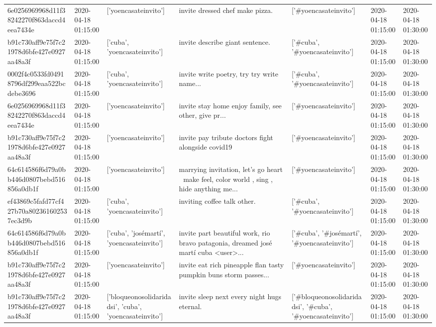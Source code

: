 \begin{tabular}{lllllll}
6e0256969968d11f38242270f863daccd4eea7434e & 2020-04-18 01:15:00 & ['yoencasateinvito'] & invite dressed chef make pizza. & ['#yoencasateinvito'] & 2020-04-18 01:15:00 & 2020-04-18 01:30:00 \\
b91c730aff9e75f7c21978d6bfe427e0927aa48a3f & 2020-04-18 01:15:00 & ['cuba', 'yoencasateinvito'] & invite describe giant sentence. & ['#cuba', '#yoencasateinvito'] & 2020-04-18 01:15:00 & 2020-04-18 01:30:00 \\
0002f4c0533fd04918796df299eaa522bcdebe3696 & 2020-04-18 01:15:00 & ['cuba', 'yoencasateinvito'] & invite write poetry, try try write name... & ['#cuba', '#yoencasateinvito'] & 2020-04-18 01:15:00 & 2020-04-18 01:30:00 \\
6e0256969968d11f38242270f863daccd4eea7434e & 2020-04-18 01:15:00 & ['yoencasateinvito'] & invite stay home enjoy family, see other, give pr... & ['#yoencasateinvito'] & 2020-04-18 01:15:00 & 2020-04-18 01:30:00 \\
b91c730aff9e75f7c21978d6bfe427e0927aa48a3f & 2020-04-18 01:15:00 & ['yoencasateinvito'] & invite pay tribute doctors fight alongside covid19 & ['#yoencasateinvito'] & 2020-04-18 01:15:00 & 2020-04-18 01:30:00 \\
64c614586f6d79a0bb446d0807bebd516856a0db1f & 2020-04-18 01:15:00 & ['yoencasateinvito'] & marrying invitation, let's go heart 💖 make feel, color world , sing , hide anything me... & ['#yoencasateinvito'] & 2020-04-18 01:15:00 & 2020-04-18 01:30:00 \\
ef43869c5fafd77cf427b70a802361602537ec3d9b & 2020-04-18 01:15:00 & ['cuba', 'yoencasateinvito'] & inviting coffee talk other. & ['#cuba', '#yoencasateinvito'] & 2020-04-18 01:15:00 & 2020-04-18 01:30:00 \\
64c614586f6d79a0bb446d0807bebd516856a0db1f & 2020-04-18 01:15:00 & ['cuba', 'josémartí', 'yoencasateinvito'] & invite part beautiful work, rio bravo patagonia, dreamed josé martí cuba <user>... & ['#cuba', '#josémartí', '#yoencasateinvito'] & 2020-04-18 01:15:00 & 2020-04-18 01:30:00 \\
b91c730aff9e75f7c21978d6bfe427e0927aa48a3f & 2020-04-18 01:15:00 & ['yoencasateinvito'] & invite eat rich pineapple flan tasty pumpkin buns storm passes... & ['#yoencasateinvito'] & 2020-04-18 01:15:00 & 2020-04-18 01:30:00 \\
b91c730aff9e75f7c21978d6bfe427e0927aa48a3f & 2020-04-18 01:15:00 & ['bloqueonosolidaridadsi', 'cuba', 'yoencasateinvito'] & invite sleep next every night hugs eternal. & ['#bloqueonosolidaridadsi', '#cuba', '#yoencasateinvito'] & 2020-04-18 01:15:00 & 2020-04-18 01:30:00 \\

\end{tabular}
